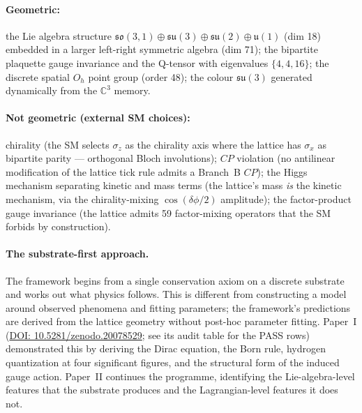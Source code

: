\paragraph{Geometric:} the Lie algebra structure
$\mathfrak{so}(3,1) \oplus \mathfrak{su}(3) \oplus \mathfrak{su}(2)
\oplus \mathfrak{u}(1)$ (dim 18) embedded in a larger left-right
symmetric algebra (dim 71); the bipartite plaquette gauge
invariance and the Q-tensor with eigenvalues $\{4, 4, 16\}$; the
discrete spatial $O_h$ point group (order 48); the colour
$\mathfrak{su}(3)$ generated dynamically from the
$\mathbb{C}^3$ memory.

\paragraph{Not geometric (external SM choices):} chirality (the SM
selects $\sigma_z$ as the chirality axis where the lattice has
$\sigma_x$ as bipartite parity --- orthogonal Bloch involutions);
$CP$ violation (no antilinear modification of the lattice tick
rule admits a Branch~B $CP$); the Higgs mechanism separating
kinetic and mass terms (the lattice's mass \emph{is} the kinetic
mechanism, via the chirality-mixing $\cos(\delta\phi/2)$
amplitude); the factor-product gauge invariance (the lattice
admits 59 factor-mixing operators that the SM forbids by
construction).

\paragraph{The substrate-first approach.}  The framework begins
from a single conservation axiom on a discrete substrate and
works out what physics follows.  This is different from
constructing a model around observed phenomena and fitting
parameters; the framework's predictions are derived from the
lattice geometry without post-hoc parameter fitting.  Paper~I
(\href{https://doi.org/10.5281/zenodo.20078529}{DOI:
10.5281/zenodo.20078529}; see its audit table for the PASS rows)
demonstrated this by deriving the Dirac equation, the Born rule,
hydrogen quantization at four significant figures, and the
structural form of the induced gauge action.  Paper~II continues
the programme, identifying the Lie-algebra-level features that
the substrate produces and the Lagrangian-level features it does
not.

